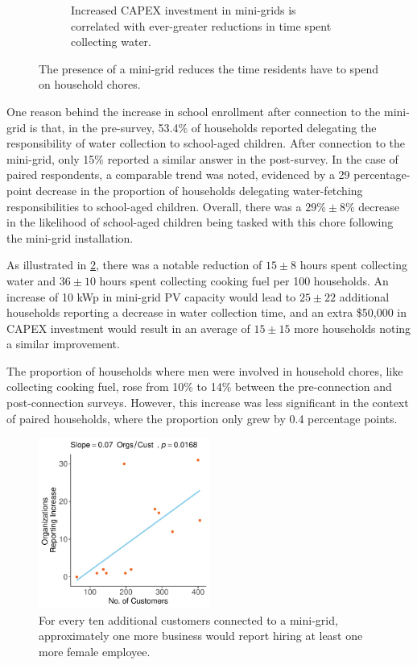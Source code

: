\begin{figure}[t]
\begin{subfigure}[t]{0.48\textwidth}
        \caption{Increased CAPEX investment in mini-grids is correlated with ever-greater reductions in time spent collecting water.}
        \label{fig:water_collection}
    \end{subfigure}
    \caption{The presence of a mini-grid reduces the time residents have to spend on household chores.}
    \label{fig:water-and-fuel-collection}
\end{figure}

One reason behind the increase in school enrollment after connection to the mini-grid is that, in the pre-survey, 53.4\% of households reported delegating the responsibility of water collection to school-aged children. After connection to the mini-grid, only 15\% reported a similar answer in the post-survey. In the case of paired respondents, a comparable trend was noted, evidenced by a 29 percentage-point decrease in the proportion of households delegating water-fetching responsibilities to school-aged children. Overall, there was a $29\%\pm8\%$ decrease in the likelihood of school-aged children being tasked with this chore following the mini-grid installation.

As illustrated in \cref{fig:water-and-fuel-collection}, there was a notable reduction of $15\pm8$ hours spent collecting water and $36\pm10$ hours spent collecting cooking fuel per 100 households. An increase of 10 kWp in mini-grid PV capacity would lead to $25\pm22$ additional households reporting a decrease in water collection time, and an extra \$50,000 in CAPEX investment would result in an average of $15\pm15$ more households noting a similar improvement.

The proportion of households where men were involved in household chores, like collecting cooking fuel, rose from 10\% to 14\% between the pre-connection and post-connection surveys. However, this increase was less significant in the context of paired households, where the proportion only grew by 0.4 percentage points.

\begin{figure}[t]
    \centering
    \includegraphics[width=0.5\textwidth]{images/hired_women_regression_community.pdf}
    \caption{For every ten additional customers connected to a mini-grid, approximately one more business would report hiring at least one more female employee.}
    \label{fig:women_employment}
\end{figure}

